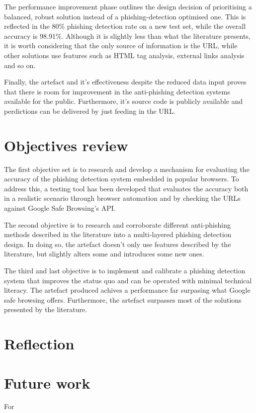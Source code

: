 The performance improvement phase outlines the design decision of prioritising a balanced, robust solution instead of a phishing-detection optimised one. This is reflected in the 80\% phishing detection rate on a new test set, while the overall accuracy is 98.91\%. Although it is slightly less than what the literature presents, it is worth considering that the only source of information is the URL, while other solutions use features such as HTML tag analysis, external links analysis and so on.

Finally, the artefact and it's effectiveness despite the reduced data input proves that there is room for improvement in the anti-phishing detection systems available for the public. Furthermore, it's source code is publicly available and perdictions can be delivered by just feeding in the URL.

\section{Objectives review}
The first objective set is to research and develop a mechanism for evaluating the accuracy of the phishing detection system embedded in popular browsers. To address this, a testing tool has been developed that evaluates the accuracy both in a realistic scenario through browser automation and by checking the URLs against Google Safe Browsing's API.

The second objective is to research and corroborate different anti-phishing methods described in the literature into a multi-layered phishing detection design. In doing so, the artefact doesn't only use features described by the literature, but slightly alters some and introduces some new ones. 

The third and last objective is to implement and calibrate a phishing detection system that improves the status quo and can be operated with minimal technical literacy. The artefact produced achives a performance far surpasing what Google safe browsing offers. Furthermore, the artefact surpasses most of the solutions presented by the literature.

\section{Reflection}






\section{Future work}
For 

